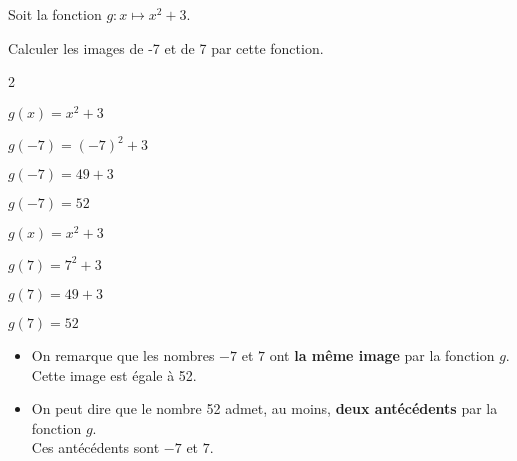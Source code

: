 \begin{exemple*1}
    Soit la fonction $g : x \longmapsto x^2 + 3$.
    
    Calculer les images de -7 et de 7 par cette fonction.
    \correction
    \begin{multicols}2
        \begin{list}{}
        \item $g(x)=x^2 + 3$
        \item $g(-7)=(-7)^2 + 3$
        \item $g(-7)=49 + 3$
        \item $g(-7)=52$ 
        \end{list}
        \begin{list}{}
        \item $g(x)=x^2 + 3$
        \item $g(7)=7^2 + 3$
        \item $g(7)=49 + 3$
        \item $g(7)=52$ 
        \end{list}
    \end{multicols}
    \begin{itemize}
        \item On remarque que les nombres $-7$ et $7$ ont \textbf{la même image} par la fonction $g$.\\
        Cette image est égale à 52.
        \item On peut dire que le nombre 52 admet, au moins, \textbf{deux antécédents} par la fonction $g$.\\
        Ces antécédents sont $-7$ et $7$.
    \end{itemize}
\end{exemple*1}